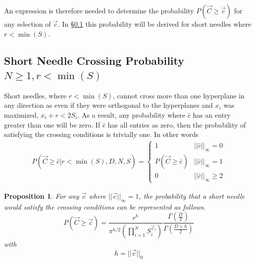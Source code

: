 \documentclass{article}
\newtheorem{proposition}{Proposition}
\begin{document}
An expression is therefore needed to determine the probability $P(\vec{C}\ge \vec{c})$ for any selection of
$\vec{c}$. In \S\ref{s:general short needle} this probability will be derived for short needles where
$r<\min(S)$.

\subsection{Short Needle Crossing Probability $N\ge 1, r<\min(S)$}\label{s:general short needle}
Short needles, where $r<\min(S)$, cannot cross more than one hyperplane in any direction as even if they were
orthogonal to the hyperplanes and $x_i$ was maximized, $x_i + r < 2S_i$. As a result, any probability where
$\bar{c}$ has an entry greater than one will be zero. If $\bar{c}$ has all entries as zero, then the probability 
of satisfying the crossing conditions is trivially one. In other words
\begin{gather}
	P(\vec{C}\ge \bar{c}|r<\min(S),D,N,S) = \begin{cases}
		1 & ||\bar{c}||_\infty = 0 \\
		P(\vec{C}\ge \bar{c}) & ||\bar{c}||_\infty = 1 \\
		0 & ||\bar{c}||_\infty \ge 2
	\end{cases} \label{eq:short needle cbar conditions}
\end{gather}

\begin{proposition}
	For any $\vec{c}$ where
	$||\vec{c}||_{\infty} = 1$, the probability that a short needle would
	satisfy the crossing conditions can be represented as follows.
	\begin{equation}
		P(\vec{C}\ge \vec{c}) = \frac{r^h }{ \pi^{h/2} (\prod_{i=1}^N S_i^{\vec{c}_i}) }\frac{\Gamma(\frac{D}{2})}{\Gamma(\frac{D+h}{2})}
	\end{equation}
	with
	\begin{equation}
		h = ||\vec{c}||_0
	\end{equation}
\end{proposition}
\end{document}
